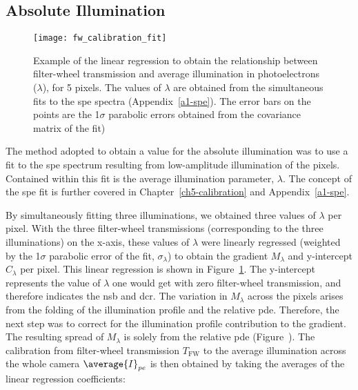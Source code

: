 \subsection{Absolute Illumination} \label{section:absolute_illumination}

\begin{figure}
	\centering
    \texttt{[image: fw\_calibration\_fit]} 
	\caption[Obtaining relationship between filter-wheel transmission and average illumination.]{Example of the linear regression to obtain the relationship between filter-wheel transmission and average illumination in photoelectrons ($\lambda$), for 5 pixels. The values of $\lambda$ are obtained from the simultaneous fits to the \gls{spe} spectra (Appendix~\ref{a1-spe}). The error bars on the points are the \si{1}{$\sigma$} parabolic errors obtained from the covariance matrix of the fit)}
	\label{fig:fw_calibration_fit}
\end{figure}

The method adopted to obtain a value for the absolute illumination was to use a fit to the \gls{spe} spectrum resulting from low-amplitude illumination of the pixels. Contained within this fit is the average illumination parameter, $\lambda$. The concept of the \gls{spe} fit is further covered in Chapter~\ref{ch5-calibration} and Appendix~\ref{a1-spe}.

By simultaneously fitting three illuminations, we obtained three values of $\lambda$ per pixel. With the three filter-wheel transmissions (corresponding to the three illuminations) on the x-axis, these values of $\lambda$ were linearly regressed (weighted by the \si{1}{$\sigma$} parabolic error of the fit, $\sigma_\lambda$) to obtain the gradient $M_\lambda$ and y-intercept $C_\lambda$ per pixel. This linear regression is shown in Figure~\ref{fig:fw_calibration_fit}. The y-intercept represents the value of $\lambda$ one would get with zero filter-wheel transmission, and therefore indicates the \gls{nsb} and \gls{dcr}. The variation in $M_\lambda$ across the pixels arises from the folding of the illumination profile and the relative \gls{pde}. Therefore, the next step was to correct for the illumination profile contribution to the gradient. The resulting spread of $M_\lambda$ is solely from the relative \gls{pde} (Figure~). The calibration from filter-wheel transmission $T_\text{FW}$ to the average illumination across the whole camera $\average{I}_{pe}$ is then obtained by taking the averages of the linear regression coefficients:

